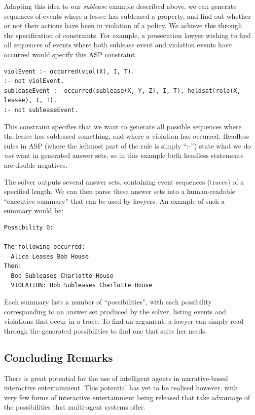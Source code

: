 \documentclass[11pt]{report}
\begin{document}
Adapting this idea to our \emph{sublease} example described above,
we can generate sequences of events where a lessee has
subleased a property, and find out whether or not their actions have been in
violation of a policy. We achieve this through the specification of constraints.
For example, a prosecution lawyer wishing to find all sequences of events where
both sublease event and violation events have occurred would specify this ASP
constraint.

\begin{lstlisting}
violEvent :- occurred(viol(X), I, T).
:- not violEvent.
subleaseEvent :- occurred(sublease(X, Y, Z), I, T), holdsat(role(X, lessee), I, T).
:- not subleaseEvent.
\end{lstlisting}

This constraint specifies that we want to generate all possible sequences where
the lessee has subleased something, and where a violation has occurred. Headless
rules in ASP (where the leftmost part of the rule is simply ``:-'') state what we
do \emph{not} want in generated answer sets, so in this example both headless
statements are double negatives.

The solver outputs several answer sets, containing event sequences (traces) of a
specified length. We can then parse these answer sets into a human-readable
``executive summary'' that can be used by lawyers. An example of such a summary
would be:

\begin{lstlisting}
Possibility 0:

The following occurred:
  Alice Leases Bob House
Then:
  Bob Subleases Charlotte House
  VIOLATION: Bob Subleases Charlotte House
\end{lstlisting}

Each summary lists a number of ``possibilities'', with each possibility
corresponding to an answer set produced by the solver, listing events and violations that occur
in a trace. To find an argument, a lawyer can simply read through the generated
possibilities to find one that suits her needs.

\subsection{Concluding Remarks}
There is great potential for the use of intelligent agents in narrative-based
interactive entertainment. This potential has yet to be realised however, with
very few forms of interactive entertainment being released that take advantage
of the possibilities that multi-agent systems offer.
\end{document}
